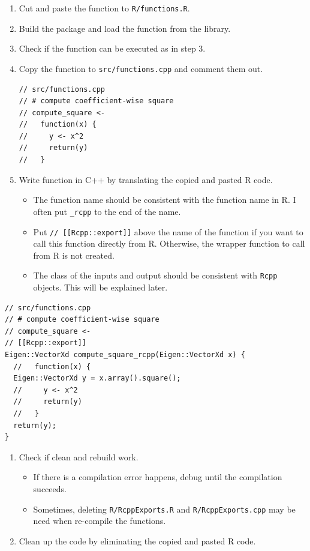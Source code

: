 \documentclass[]{book}
\providecommand{\tightlist}{%
  \setlength{\itemsep}{0pt}\setlength{\parskip}{0pt}}
\begin{document}
\begin{enumerate}
\def\labelenumi{\arabic{enumi}.}
\setcounter{enumi}{3}
\item
  Cut and paste the function to \texttt{R/functions.R}.
\item
  Build the package and load the function from the library.
\item
  Check if the function can be executed as in step 3.
\item
  Copy the function to \texttt{src/functions.cpp} and comment them out.

\begin{verbatim}
// src/functions.cpp
// # compute coefficient-wise square
// compute_square <-
//   function(x) {
//     y <- x^2
//     return(y)
//   }
\end{verbatim}
\item
  Write function in C++ by translating the copied and pasted R code.

  \begin{itemize}
  \tightlist
  \item
    The function name should be consistent with the function name in R.
    I often put \texttt{\_rcpp} to the end of the name.
  \item
    Put \texttt{//\ {[}{[}Rcpp::export{]}{]}} above the name of the
    function if you want to call this function directly from R.
    Otherwise, the wrapper function to call from R is not created.
  \item
    The class of the inputs and output should be consistent with
    \texttt{Rcpp} objects. This will be explained later.
  \end{itemize}
\end{enumerate}

\begin{verbatim}
// src/functions.cpp
// # compute coefficient-wise square
// compute_square <-
// [[Rcpp::export]]
Eigen::VectorXd compute_square_rcpp(Eigen::VectorXd x) {
  //   function(x) {
  Eigen::VectorXd y = x.array().square();
  //     y <- x^2
  //     return(y)
  //   }
  return(y);
}
\end{verbatim}

\begin{enumerate}
\def\labelenumi{\arabic{enumi}.}
\setcounter{enumi}{8}
\tightlist
\item
  Check if clean and rebuild work.

  \begin{itemize}
  \tightlist
  \item
    If there is a compilation error happens, debug until the compilation
    succeeds.
  \item
    Sometimes, deleting \texttt{R/RcppExports.R} and
    \texttt{R/RcppExports.cpp} may be need when re-compile the
    functions.
  \end{itemize}
\item
  Clean up the code by eliminating the copied and pasted R code.
\end{enumerate}
\end{document}
